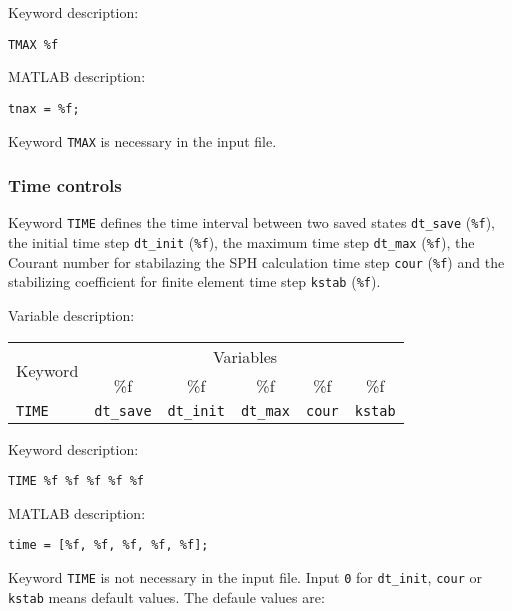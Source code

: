 Keyword description:

\begin{tcolorbox}
\texttt{TMAX \%f}
\end{tcolorbox}

MATLAB description:

\begin{tcolorbox}
\texttt{tnax = \%f;}
\end{tcolorbox}

Keyword \texttt{TMAX} is necessary in the input file.

\newpage


\subsubsection{Time controls}

Keyword \texttt{TIME} defines the time interval between two saved states \texttt{dt\_save} (\texttt{\%f}), the initial time step \texttt{dt\_init} (\texttt{\%f}), the maximum time step \texttt{dt\_max} (\texttt{\%f}), the Courant number for stabilazing the SPH calculation time step \texttt{cour} (\texttt{\%f}) and the stabilizing coefficient for finite element time step \texttt{kstab} (\texttt{\%f}). 

Variable description:

\begin{tabular}{|l|c|c|c|c|c|}
\hline
\multirow{2}{*}{Keyword} & \multicolumn{5}{c|}{Variables} \\ \cline{2-6}
& \%f& \%f & \%f & \%f & \%f \\ \hline
\texttt{TIME} & \texttt{dt\_save} & \texttt{dt\_init} & \texttt{dt\_max} & \texttt{cour} & \texttt{kstab} \\ \hline
\end{tabular}

Keyword description:

\begin{tcolorbox}
\texttt{TIME \%f \%f \%f \%f \%f}
\end{tcolorbox}

MATLAB description:

\begin{tcolorbox}
\texttt{time = [\%f, \%f, \%f, \%f, \%f];}
\end{tcolorbox}

Keyword \texttt{TIME} is not necessary in the input file. Input \texttt{0} for \texttt{dt\_init}, \texttt{cour} or \texttt{kstab} means default values. The defaule values are:

